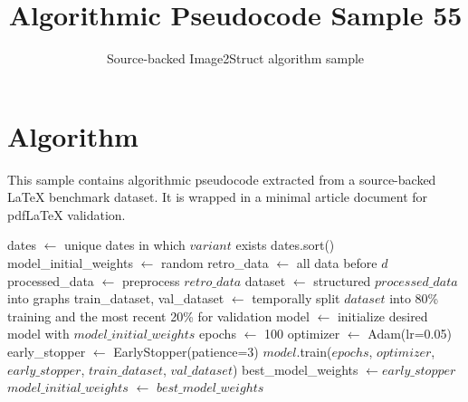\documentclass[11pt]{article}
\title{Algorithmic Pseudocode Sample 55}
\author{Source-backed Image2Struct algorithm sample}
\date{}
\begin{document}
\maketitle
\section{Algorithm}
This sample contains algorithmic pseudocode extracted from a source-backed LaTeX benchmark dataset. It is wrapped in a minimal article document for pdfLaTeX validation.

\begin{algorithm}[htbp]
\caption{Source-backed algorithmic procedure}
\begin{algorithmic}[1]
\State dates $\gets$ unique dates in which $variant$ exists
\State dates.sort()
\State model\_initial\_weights $\gets$ random
\State retro\_data $\gets$ all data before $d$
\State processed\_data $\gets$ preprocess $retro\_data$
\State dataset $\gets$ structured $processed\_data$ into graphs
\State train\_dataset, val\_dataset $\gets$ temporally split $dataset$ into 80\% training and the most recent 20\% for validation
\State model $\gets$ initialize desired model with $model\_initial\_weights$
\State epochs $\gets$ 100
\State optimizer $\gets$ Adam(lr=0.05)
\State early\_stopper $\gets$ EarlyStopper(patience=3)
\State $model$.train($epochs$, $optimizer$, $early\_stopper$, $train\_dataset$, $val\_dataset$)
\State best\_model\_weights $\gets early\_stopper$
\State $model\_initial\_weights$ $\gets$ $best\_model\_weights$
\EndFor
\EndFor
\end{algorithmic}
\end{algorithm}
\end{document}
